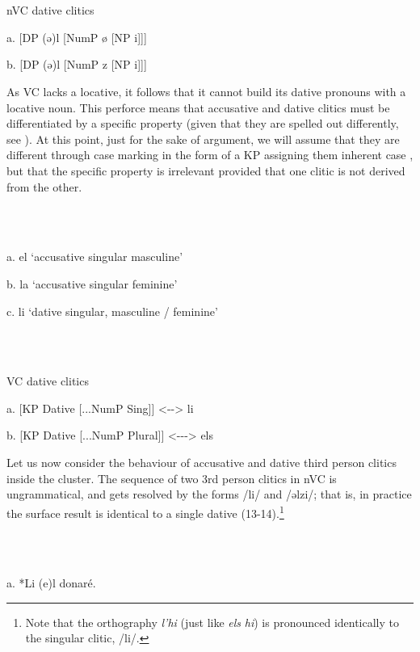 \documentclass[output=paper,colorlinks,citecolor=brown]{./langscibook}
\begin{document}
\ea%
    \label{ex:key:10}
    \gll\\
        \\
    \glt
    \z

          nVC dative clitics

  a. [DP  (ǝ)l  [NumP  ø  [NP  i]]]

  b. [DP  (ǝ)l  [NumP  z  [NP  i]]]

As VC lacks a locative, it follows that it cannot build its dative pronouns with a locative noun. This perforce means that accusative and dative clitics must be differentiated by a specific property (given that they are spelled out differently, see ). At this point, just for the sake of argument, we will assume that they are different through case marking in the form of a KP assigning them inherent case , but that the specific property is irrelevant provided that one clitic is not derived from the other.

\ea%
    \label{ex:key:11}
    \gll\\
        \\
    \glt
    \z

           a. el ‘accusative singular masculine’

   b. la ‘accusative singular feminine’

   c. li ‘dative singular, masculine / feminine’ 

\ea%
    \label{ex:key:12}
    \gll\\
        \\
    \glt
    \z

         VC dative clitics

  a. [KP  Dative   [...NumP Sing]]   <-{}-> li

  b. [KP Dative   [...NumP Plural]]  <-{}-{}-> els    

Let us now consider the behaviour of accusative and dative third person clitics inside the cluster. The sequence of two 3rd person clitics in nVC is ungrammatical, and gets resolved by the forms /li/ and /ǝlzi/; that is, in practice the surface result is identical to a single dative (13-14).\footnote{Note that the orthography \textit{l’hi} (just like \textit{els} \textit{hi}) is pronounced identically to the singular clitic, /li/.} 

\ea%
    \label{ex:key:13}
    \gll\\
        \\
    \glt
    \z

         a. *Li     (e)l     donaré.
\end{document}
